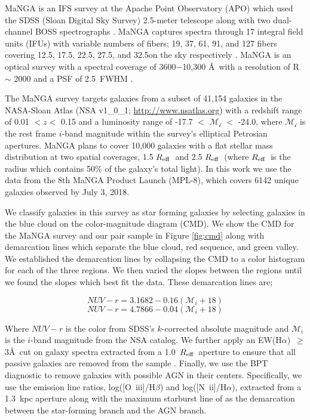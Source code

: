 \documentclass[iop,revtex4,twocolumn,apj,numberedappendix,appendixfloats]{emulateapj}
\newcommand{\reff}{$R_{\rm eff}$}
\newcommand{\ewha}{EW(H$\alpha$)}
\begin{document}
MaNGA is an IFS survey at the Apache Point Observatory (APO) which used the SDSS (Sloan Digital Sky Survey) 2.5-meter telescope along with two dual-channel BOSS spectrographs \citep{Drory:2015}. MaNGA captures spectra through 17 integral field units (IFUs) with variable numbers of fibers; 19, 37, 61, 91, and 127 fibers covering 12.5\arcsec, 17.5\arcsec, 22.5\arcsec, 27.5\arcsec, and 32.5\arcsec on the sky respectively \citep{Law:2015}. MaNGA is an optical survey with a spectral coverage of 3600$-$10,300 \AA\ with a resolution of R $\sim$ 2000 and a PSF of 2.5\arcsec\ FWHM \citep{Bundy:2015}. 

The MaNGA survey targets galaxies from a subset of 41,154 galaxies in the NASA-Sloan Atlas (NSA v1\_0\_1; \url{http://www.nsatlas.org}) with a redshift range of 0.01 $< z <$ 0.15 and a luminosity range of -17.7 $<$ $\mathcal{M_i}$ $<$ -24.0, where $\mathcal{M_i}$ is the rest frame $i$-band magnitude within the survey's elliptical Petrosian apertures. MaNGA plans to cover 10,000 galaxies with a flat stellar mass distribution at two spatial coverages, 1.5 \reff\ and 2.5 \reff\ (where \reff\ is the radius which contains 50\% of the galaxy's total light). In this work we use the data from the 8th MaNGA Product Launch (MPL-8), which covers 6142 unique galaxies observed by July 3, 2018. 

We classify galaxies in this survey as star forming galaxies by selecting galaxies in the blue cloud on the color-magnitude diagram (CMD). We show the CMD for the MaNGA survey and our pair sample in Figure \ref{fig:cmd} along with demarcation lines which separate the blue cloud, red sequence, and green valley. We established the demarcation lines by collapsing the CMD to a color histogram for each of the three regions. We then varied the slopes between the regions until we found the slopes which best fit the data. These demarcation lines are;

\begin{equation}\label{eq:blue}
NUV-r = 3.1682 - 0.16 (\mathcal{M}_i+18)
\end{equation}
\begin{equation}\label{eq:red}
NUV-r = 4.7866 - 0.04 (\mathcal{M}_i+18)
\end{equation}

Where $NUV-r$ is the color from SDSS's $k$-corrected absolute magnitude and $\mathcal{M}_i$ is the $i$-band magnitude from the NSA catalog. We further apply an \ewha\ $\ge$ 3\AA\ cut on galaxy spectra extracted from a 1.0~\reff\ aperture to ensure that all passive galaxies are removed from the sample \citep{Cid-Fernandes:2011}. Finally, we use the BPT diagnostic \citep{Baldwin:1981} to remove galaxies with possible AGN in their centers. Specifically, we use the emission line ratios, log([O~{\sc iii}]/H$\beta$) and log([N~{\sc ii}]/H$\alpha$), extracted from a 1.3~kpc aperture along with the maximum starburst line of \citet{Kewley:2001} as the demarcation between the star-forming branch and the AGN branch.
\end{document}
